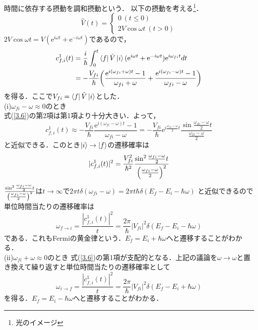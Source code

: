 \documentclass{standalone}
\begin{document}
  時間に依存する摂動を調和摂動という．
  以下の摂動を考える\footnote{光のイメージ}．
  \begin{equation}
    \hat{V}(t)=
    \begin{cases}
    0\ (t\le0)\\
    2V\cos\omega t\ (t>0)
    \end{cases}
  \end{equation}
  $2V\cos\omega t=V(\mathrm{e}^{i\omega t}+\mathrm{e}^{-i\omega t})$であるので，
  \begin{align}
    c^1_{f,i}(t)&=\frac{i}{\hbar}\int_{0}^{t}\bra{f}\hat{V}\ket{i}(\mathrm{e}^{i\omega t}+\mathrm{e}^{-i\omega t})\mathrm{e}^{i\omega_{fi}t}dt\\
    \label{3.6}
    &=-\frac{V_{fi}}{\hbar}\qty(\frac{\mathrm{e}^{i(\omega_{fi}+\omega)t}-1}{\omega_{fi}+\omega}+\frac{\mathrm{e}^{i(\omega_{fi}-\omega)t}-1}{\omega_{fi}-\omega})
  \end{align}
  を得る．ここで$V_{fi}=\bra{f}\hat{V}\ket{i}$とした．\\
  (i)$\omega_{fi}-\omega\approx0$のとき\\
  式(\ref{3.6})の第2項は第1項より十分大きい．よって，
  \begin{equation}
    c_{f,i}^1(t)\approx-\frac{V_{fi}}{\hbar}\frac{\mathrm{e}^{i(\omega_{fi}-\omega)t}-1}{\omega_{fi}-\omega}=-\frac{V_{fi}}{\hbar}\mathrm{e}^{i\frac{\omega_{fi}-\omega}{2}t}\frac{\sin\frac{\omega_{fi}-\omega}{2}t}{\frac{\omega_{fi}-\omega}{2}}
  \end{equation}
  と近似できる．このとき$\ket{i}\to\ket{f}$の遷移確率は
  \begin{equation}
    |c_{f,i}^1(t)|^2=\frac{V_{fi}^2}{\hbar^2}\frac{\sin^2\frac{\omega_{fi}-\omega}{2}t}{\qty(\frac{\omega_{fi}-\omega}{2})^2}
  \end{equation}
  $\frac{\sin^2\frac{\omega_{fi}-\omega}{2}t}{\qty(\frac{\omega_{fi}-\omega}{2})^2}$は$t\to\infty$で$2\pi t\delta(\omega_{fi}-\omega)=2\pi t\hbar\delta(E_f-E_i-\hbar\omega)$
  と近似できるので
  単位時間当たりの遷移確率は
  \begin{equation}
    \omega_{f\to i}=\frac{|c_{f,i}^1(t)|^2}{t}=\frac{2\pi}{\hbar}|V_{fi}|^2\delta(E_f-E_i-\hbar\omega)
  \end{equation}
  である．これもFermiの黄金律という．$E_f=E_i+\hbar\omega$へと遷移することがわかる．\\
  (ii)$\omega_{fi}+\omega\approx0$のとき
  式(\ref{3.6})の第1項が支配的となる．上記の議論を$\omega\to\omega$と置き換えて繰り返すと単位時間当たりの遷移確率として
  \begin{equation}
    \omega_{i\to f}=\frac{|c_{f,i}^1(t)|^2}{t}=\frac{2\pi}{\hbar}|V_{fi}|^2\delta(E_f-E_i+\hbar\omega)
  \end{equation}
  を得る．$E_f=E_i-\hbar\omega$へと遷移することがわかる．
\end{document}
